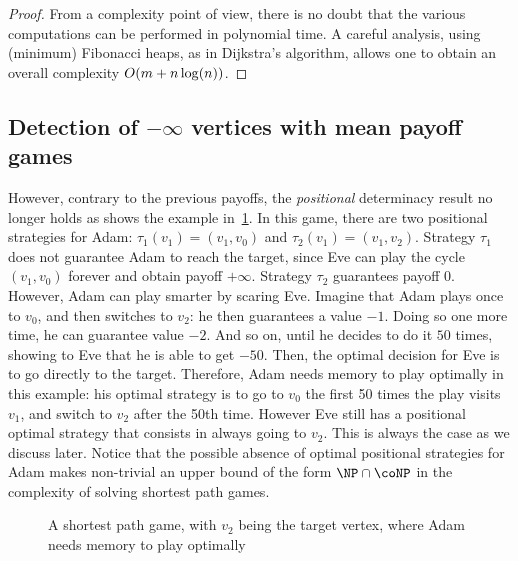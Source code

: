 \begin{proof}
  From a complexity point of view, there is no doubt that the various
  computations can be performed in polynomial time. A careful
  analysis, using (minimum) Fibonacci heaps, as in Dijkstra's
  algorithm, allows one to obtain an overall complexity
  $O(m+n\log(n))$. 
\end{proof}

\subsection*{Detection of $-\infty$ vertices with mean payoff games}
However, contrary to the previous payoffs, the \emph{positional}
determinacy result no longer holds as shows the example
in~\cref{4-fig:memory}. In this game, there are two positional
strategies for Adam: $\tau_1(v_1)=(v_1,v_0)$ and
$\tau_2(v_1)=(v_1,v_2)$. Strategy $\tau_1$ does not guarantee Adam to
reach the target, since Eve can play the cycle $(v_1,v_0)$ forever and
obtain payoff $+\infty$. Strategy $\tau_2$ guarantees payoff
$0$. However, Adam can play smarter by scaring Eve. Imagine that Adam
plays once to $v_0$, and then switches to $v_2$: he then guarantees a
value $-1$. Doing so one more time, he can guarantee value $-2$. And
so on, until he decides to do it $50$ times, showing to Eve that he is
able to get $-50$. Then, the optimal decision for Eve is to go
directly to the target. Therefore, Adam needs memory to play optimally
in this example: his optimal strategy is to go to $v_0$ the first 50
times the play visits $v_1$, and switch to $v_2$ after the 50th
time. However Eve still has a positional optimal strategy that
consists in always going to $v_2$. This is always the case as we
discuss later. Notice that the possible absence of optimal positional
strategies for Adam makes non-trivial an upper bound of the form
$\NP\cap\coNP$ in the complexity of solving shortest path games.

\begin{figure}[tbp]
  \centering
\caption{A shortest path game, with $v_2$ being the target vertex,
    where Adam needs memory to play optimally}
  \label{4-fig:memory}
\end{figure}

